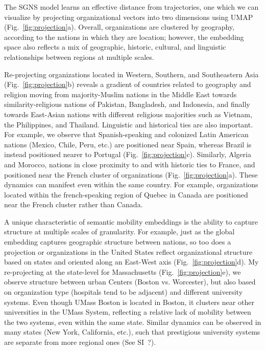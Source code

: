 \documentclass[12pt]{article} %
\begin{document}
The SGNS model learns an effective distance from trajectories, one which we can visualize by projecting organizational vectors into two dimensions using UMAP \cite{mcinnes2018umap} (Fig.~\ref{fig:projection}a).
Overall, organizations are clustered by geography, according to the nations in which they are location;
however, the embedding space also reflects a mix of geographic, historic, cultural, and linguistic relationships between regions at multiple scales.

Re-projecting organizations located in Western, Southern, and Southeastern Asia (Fig.~\ref{fig:projection}b) reveals a gradient of countries related to geography and religion moving from majority-Muslim nations in the Middle East towards similarity-religious nations of Pakistan, Bangladesh, and Indonesia, and finally towards East-Asian nations with different religious majorities such as Vietnam, the Philippines, and Thailand. 
Linguistic and historical ties are also important. 
For example, we observe that Spanish-speaking and colonized Latin American nations (Mexico, Chile, Peru, etc.) are positioned near Spain, whereas Brazil is instead positioned nearer to Portugal (Fig.~\ref{fig:projection}c). 
Similarly, Algeria and Morocco, nations in close proximity to and with historic ties to France, and positioned near the French cluster of organizations (Fig.~\ref{fig:projection}a). 
These dynamics can manifest even within the same country. 
For example, organizations located within the french-speaking region of Quebec in Canada are positioned near the French cluster rather than Canada.

A unique characteristic of semantic mobility embeddings is the ability to capture structure at multiple scales of granularity.
For example, just as the global embedding captures geographic structure between nations, so too does a projection or organizations in the United States reflect organizational structure based on states and oriented along an East-West axis (Fig.~\ref{fig:projection}d). 
My re-projecting at the state-level for Massachusetts (Fig.~\ref{fig:projection}e), we observe structure between urban Centers (Boston vs. Worcester), but also based on organization type (hospitals tend to be adjacent) and different university systems. Even though UMass Boston is located in Boston, it clusters near other universities in the UMass System, reflecting a relative lack of mobility between the two systems, even within the same state. 
Similar dynamics can be observed in many states (New York, California, etc.), such that prestigious university systems are separate from more regional ones (See SI~?).
\end{document}
